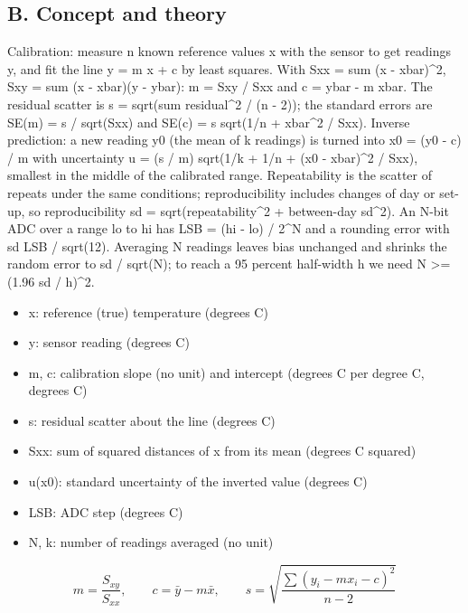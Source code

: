 \documentclass[11pt,a4paper]{article}
\begin{document}
\subsection*{B. Concept and theory}
Calibration: measure n known reference values x with the sensor to get readings y, and fit the line y = m x + c by least squares. With Sxx = sum (x - xbar)\textasciicircum{}2, Sxy = sum (x - xbar)(y - ybar): m = Sxy / Sxx and c = ybar - m xbar. The residual scatter is s = sqrt(sum residual\textasciicircum{}2 / (n - 2)); the standard errors are SE(m) = s / sqrt(Sxx) and SE(c) = s sqrt(1/n + xbar\textasciicircum{}2 / Sxx). Inverse prediction: a new reading y0 (the mean of k readings) is turned into x0 = (y0 - c) / m with uncertainty u = (s / \textbar{}m\textbar{}) sqrt(1/k + 1/n + (x0 - xbar)\textasciicircum{}2 / Sxx), smallest in the middle of the calibrated range. Repeatability is the scatter of repeats under the same conditions; reproducibility includes changes of day or set-up, so reproducibility sd = sqrt(repeatability\textasciicircum{}2 + between-day sd\textasciicircum{}2). An N-bit ADC over a range lo to hi has LSB = (hi - lo) / 2\textasciicircum{}N and a rounding error with sd LSB / sqrt(12). Averaging N readings leaves bias unchanged and shrinks the random error to sd / sqrt(N); to reach a 95 percent half-width h we need N \textgreater{}= (1.96 sd / h)\textasciicircum{}2.

\begin{itemize}[nosep]
\item x: reference (true) temperature (degrees C)
\item y: sensor reading (degrees C)
\item m, c: calibration slope (no unit) and intercept (degrees C per degree C, degrees C)
\item s: residual scatter about the line (degrees C)
\item Sxx: sum of squared distances of x from its mean (degrees C squared)
\item u(x0): standard uncertainty of the inverted value (degrees C)
\item LSB: ADC step (degrees C)
\item N, k: number of readings averaged (no unit)
\end{itemize}

\begin{equation*}
m=\frac{S_{xy}}{S_{xx}},\qquad c=\bar y-m\bar x,\qquad s=\sqrt{\frac{\sum (y_i-mx_i-c)^2}{n-2}}
\end{equation*}
\end{document}
